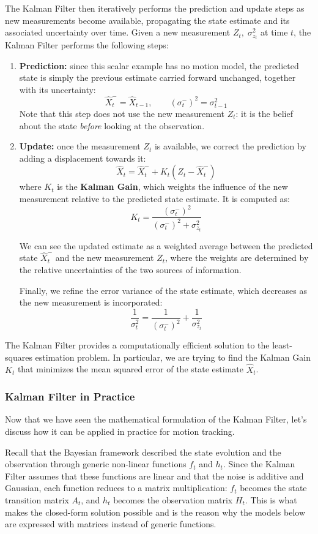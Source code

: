 The Kalman Filter then iteratively performs the prediction and update steps as new measurements become available,
propagating the state estimate and its associated uncertainty over time.
Given a new measurement $Z_t, \; \sigma_{z_t}^2$ at time $t$, the Kalman Filter performs the following steps:
\begin{enumerate}
    \item \textbf{Prediction:} since this scalar example has no motion model, the predicted state is simply the previous estimate carried forward unchanged, together with its uncertainty:
    $$\hat{X}_t^- = \hat{X}_{t-1}, \qquad (\sigma_t^-)^2 = \sigma_{t-1}^2$$
    Note that this step does not use the new measurement $Z_t$: it is the belief about the state \emph{before} looking at the observation.

    \item \textbf{Update:} once the measurement $Z_t$ is available, we correct the prediction by adding a displacement towards it:
    $$\hat{X}_t = \hat{X}_t^- + K_t (Z_t - \hat{X}_t^-)$$
    where $K_t$ is the \textbf{Kalman Gain}, which weights the influence of the new measurement
    relative to the predicted state estimate. It is computed as:
    $$K_t = \frac{(\sigma_t^-)^2}{(\sigma_t^-)^2 + \sigma_{z_t}^2}$$

    We can see the updated estimate as a weighted average between the predicted state $\hat{X}_t^-$ and the new measurement $Z_t$,
    where the weights are determined by the relative uncertainties of the two sources of information.

    Finally, we refine the error variance of the state estimate, which decreases as the new measurement is incorporated:
    $$\frac{1}{\sigma_t^2} = \frac{1}{(\sigma_t^-)^2} + \frac{1}{\sigma_{z_t}^2}$$
\end{enumerate}
The Kalman Filter provides a computationally efficient solution to the least-squares estimation problem. In particular,
we are trying to find the Kalman Gain $K_t$ that minimizes the mean squared error of the state estimate $\hat{X}_t$.

\subsubsection{Kalman Filter in Practice}
Now that we have seen the mathematical formulation of the Kalman Filter, let's discuss how it can be applied in practice for motion tracking.

Recall that the Bayesian framework described the state evolution and the observation through generic non-linear functions $f_t$ and $h_t$.
Since the Kalman Filter assumes that these functions are linear and that the noise is additive and Gaussian, each function reduces to a matrix multiplication:
$f_t$ becomes the state transition matrix $A_t$, and $h_t$ becomes the observation matrix $H_t$.
This is what makes the closed-form solution possible and is the reason why the models below are expressed with matrices instead of generic functions.

